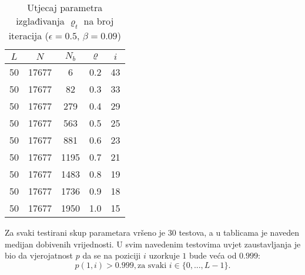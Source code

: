 \documentclass[times, utf8, zavrsni]{fer}
\begin{document}
\begin{table}[h!]
  \caption{Utjecaj parametra izglađivanja $\varrho_t$ na broj iteracija ($\epsilon = 0.5$, $\beta = 0.09$)}
  \label{tbl:promjenaQ}
  \centering
  \begin{tabular}{c | c | c | c | c}
    $L$ & $N$ & $N_b$ & $\varrho$ & $i$ \\ \hline
    50 & 17677 & 6 & 0.2 & 43 \\ \hline
    50 & 17677 & 82 & 0.3 & 33 \\ \hline
    50 & 17677 & 279 & 0.4 & 29 \\ \hline
    50 & 17677 & 563 & 0.5 & 25 \\ \hline
    50 & 17677 & 881 & 0.6 & 23 \\ \hline
    50 & 17677 & 1195 & 0.7 & 21 \\ \hline
    50 & 17677 & 1483 & 0.8 & 19 \\ \hline
    50 & 17677 & 1736 & 0.9 & 18 \\ \hline
    50 & 17677 & 1950 & 1.0 & 15
  \end{tabular}
\end{table}

Za svaki testirani skup parametara vršeno je $30$ testova, a u tablicama je naveden medijan dobivenih vrijednosti.
U svim navedenim testovima uvjet zaustavljanja je bio da vjerojatnost $p$ da se na poziciji $i$ uzorkuje $1$ bude veća od $0.999$:
$$
p(1, i) > 0.999, \text{za svaki }  i \in \{ 0,..., L-1 \} .
$$
\end{document}
